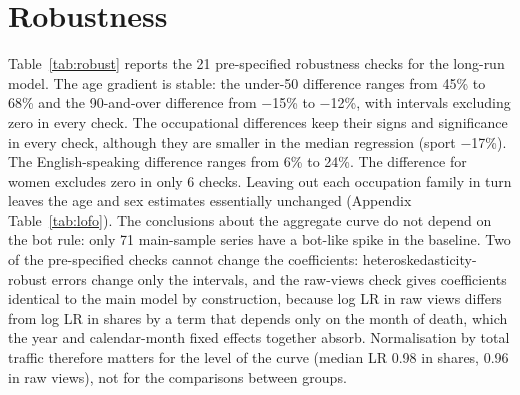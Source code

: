 \documentclass[11pt,a4paper]{article}
\begin{document}
\section{Robustness}\label{sec:robust}
Table~\ref{tab:robust} reports the 21 pre-specified robustness checks for the long-run model. The age gradient is stable: the under-50 difference ranges from 45\% to 68\% and the 90-and-over difference from $-$15\% to $-$12\%, with intervals excluding zero in every check. The occupational differences keep their signs and significance in every check, although they are smaller in the median regression (sport $-$17\%). The English-speaking difference ranges from 6\% to 24\%. The difference for women excludes zero in only 6 checks. Leaving out each occupation family in turn leaves the age and sex estimates essentially unchanged (Appendix Table~\ref{tab:lofo}). The conclusions about the aggregate curve do not depend on the bot rule: only 71 main-sample series have a bot-like spike in the baseline. Two of the pre-specified checks cannot change the coefficients: heteroskedasticity-robust errors change only the intervals, and the raw-views check gives coefficients identical to the main model by construction, because log LR in raw views differs from log LR in shares by a term that depends only on the month of death, which the year and calendar-month fixed effects together absorb. Normalisation by total traffic therefore matters for the level of the curve (median LR 0.98 in shares, 0.96 in raw views), not for the comparisons between groups.
\end{document}
